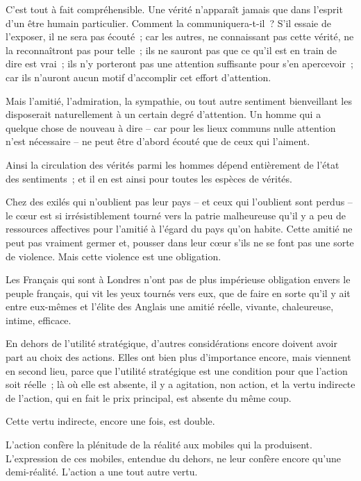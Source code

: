\documentclass[french,twoside]{book} %
\begin{document}
C'est tout à fait compréhensible. Une vérité n'apparaît jamais que dans l'esprit d'un être humain particulier. Comment la communiquera-t-il ? S'il essaie de l'exposer, il ne sera pas écouté ; car les autres, ne connaissant pas cette vérité, ne la reconnaîtront pas pour telle ; ils ne sauront pas que ce qu'il est en train de dire est vrai ; ils n'y porteront pas une attention suffisante pour s'en apercevoir ; car ils n'auront aucun motif d'accomplir cet effort d'attention.\par
Mais l'amitié, l'admiration, la sympathie, ou tout autre sentiment bienveillant les disposerait naturellement à un certain degré d'attention. Un homme qui a quelque chose de nouveau à dire – car pour les lieux communs nulle attention n'est nécessaire – ne peut être d'abord écouté que de ceux qui l'aiment.\par
Ainsi la circulation des vérités parmi les hommes dépend entièrement de l'état des sentiments ; et il en est ainsi pour toutes les espèces de vérités.\par
Chez des exilés qui n'oublient pas leur pays – et ceux qui l'oublient sont perdus – le cœur est si irrésistiblement tourné vers la patrie malheureuse qu'il y a peu de ressources affectives pour l'amitié à l'égard du pays qu'on habite. Cette amitié ne peut pas vraiment germer et, pousser dans leur cœur s'ils ne se font pas une sorte de violence. Mais cette violence est une obligation.\par
Les Français qui sont à Londres n'ont pas de plus impérieuse obligation envers le peuple français, qui vit les yeux tournés vers eux, que de faire en sorte qu'il y ait entre eux-mêmes et l'élite des Anglais une amitié réelle, vivante, chaleureuse, intime, efficace.\par
En dehors de l'utilité stratégique, d'autres considérations encore doivent avoir part au choix des actions. Elles ont bien plus d'importance encore, mais viennent en second lieu, parce que l'utilité stratégique est une condition pour que l'action soit réelle ; là où elle est absente, il y a agitation, non action, et la vertu indirecte de l'action, qui en fait le prix principal, est absente du même coup.\par
Cette vertu indirecte, encore une fois, est double.\par
L'action confère la plénitude de la réalité aux mobiles qui la produisent. L'expression de ces mobiles, entendue du dehors, ne leur confère encore qu'une demi-réalité. L'action a une tout autre vertu.\par
\end{document}
